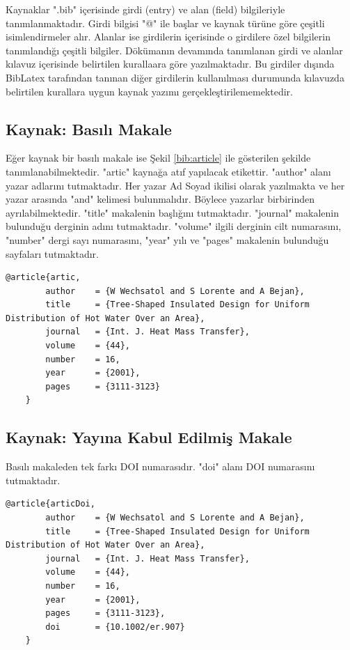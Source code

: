 Kaynaklar ".bib" içerisinde girdi (entry) ve alan (field) bilgileriyle tanımlanmaktadır. Girdi bilgisi "@" ile başlar ve kaynak türüne göre çeşitli isimlendirmeler alır. Alanlar ise girdilerin içerisinde o girdilere özel bilgilerin tanımlandığı çeşitli bilgiler. Dökümanın devamında tanımlanan girdi ve alanlar kılavuz içerisinde belirtilen kurallaara göre yazılmaktadır. Bu girdiler dışında BibLatex tarafından tanınan diğer girdilerin kullanılması durumunda kılavuzda belirtilen kurallara uygun kaynak yazımı gerçekleştirilememektedir.

\subsection{Kaynak: Basılı Makale}
Eğer kaynak bir basılı makale ise Şekil \ref{bib:article} ile gösterilen şekilde tanımlanabilmektedir. "artic" kaynağa atıf yapılacak etikettir. "author" alanı yazar adlarını tutmaktadır. Her yazar Ad Soyad ikilisi olarak yazılmakta ve her yazar arasında "and" kelimesi bulunmalıdır. Böylece yazarlar birbirinden ayrılabilmektedir. "title" makalenin başlığını tutmaktadır. "journal" makalenin bulunduğu derginin adını tutmaktadır. "volume" ilgili derginin cilt numarasını, "number" dergi sayı numarasını, "year" yılı ve "pages" makalenin bulunduğu sayfaları tutmaktadır.

\begin{lstlisting}[language={[LaTeX]{TeX}}, label=bib:article, caption=Kaynak basılı bir makale ise]
	@article{artic,
		author    = {W Wechsatol and S Lorente and A Bejan},
		title     = {Tree-Shaped Insulated Design for Uniform Distribution of Hot Water Over an Area},
		journal   = {Int. J. Heat Mass Transfer},
		volume    = {44},
		number    = 16,
		year      = {2001},
		pages     = {3111-3123}
	}	
\end{lstlisting}

\subsection{Kaynak: Yayına Kabul Edilmiş Makale}
Basılı makaleden tek farkı DOI numarasıdır. "doi" alanı DOI numarasını tutmaktadır.

\begin{lstlisting}[language={[LaTeX]{TeX}}, label=bib:articleDOI, caption=Kaynak kabul edilmiş bir makale ise]
	@article{articDoi,
		author    = {W Wechsatol and S Lorente and A Bejan},
		title     = {Tree-Shaped Insulated Design for Uniform Distribution of Hot Water Over an Area},
		journal   = {Int. J. Heat Mass Transfer},
		volume    = {44},
		number    = 16,
		year      = {2001},
		pages     = {3111-3123},
		doi		  = {10.1002/er.907}
	}	
\end{lstlisting}


